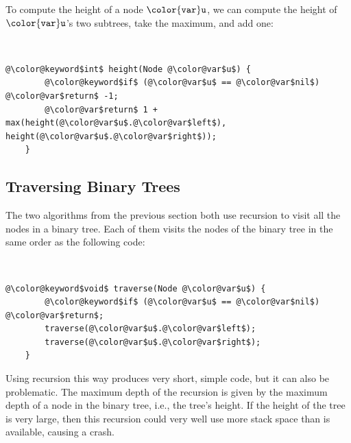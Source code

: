\documentclass[10pt]{book}
\newcommand{\seclabel}[1]{\label{sec:#1}}
\theoremstyle{plain}
\theoremstyle{definition}
\begin{document}
To compute the height of a node \ensuremath{\mathtt{{\color{var}u}}}, we can compute the height of \ensuremath{\mathtt{{\color{var}u}}}'s
two subtrees, take the maximum, and add one:



 \ \vspace{.5ex}\begin{Verbatim}[gobble=1,tabsize=2,frame=single,framerule=1.2pt,commandchars=\\@\$,label=\texttt{BinaryTree},labelposition=topline]
	@\color@keyword$int$ height(Node @\color@var$u$) {
		@\color@keyword$if$ (@\color@var$u$ == @\color@var$nil$) @\color@var$return$ -1;
		@\color@var$return$ 1 + max(height(@\color@var$u$.@\color@var$left$), height(@\color@var$u$.@\color@var$right$));
	}
\end{Verbatim}


\subsection{Traversing Binary Trees}
\seclabel{bintree:traversal}

%
%
%
The two algorithms from the previous section both use recursion to visit
all the nodes in a binary tree.  Each of them visits the nodes of the
binary tree in the same order as the following code:


 \ \vspace{.5ex}\begin{Verbatim}[gobble=1,tabsize=2,frame=single,framerule=1.2pt,commandchars=\\@\$,label=\texttt{BinaryTree},labelposition=topline]
	@\color@keyword$void$ traverse(Node @\color@var$u$) {
		@\color@keyword$if$ (@\color@var$u$ == @\color@var$nil$) @\color@var$return$;
		traverse(@\color@var$u$.@\color@var$left$);
		traverse(@\color@var$u$.@\color@var$right$);
	}
\end{Verbatim}


Using recursion this way produces very short, simple code, but it can
also be problematic.  The maximum depth of the recursion is given by
the maximum depth of a node in the binary tree, i.e., the tree's height.
If the height of the tree is very large, then this recursion could very
well use more stack space than is available, causing a crash.
\end{document}
